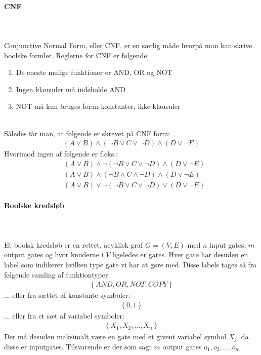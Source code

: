 \paragraph{CNF} ~\\ ~\\ Conjunctive Normal Form, eller CNF, er en særlig
måde hvorpå man kan skrive boolske formler. Reglerne for CNF er følgende:
\begin{enumerate} \item De eneste mulige funktioner er AND, OR og NOT \item
Ingen klausuler må indeholde AND \item NOT må kun bruges foran konstanter,
ikke klausuler \end{enumerate} ~\\ Således får man, at følgende er skrevet
på CNF form: \begin{align*} (A \vee B) \wedge (\neg B \vee C \vee \neg D)
\wedge (D \vee \neg E) \end{align*} Hvorimod ingen af følgende er f.eks.:
\begin{align*} &(A \vee B) \wedge \neg(\neg B \vee C \vee \neg D) \wedge (D \vee
\neg E) \\ &(A \vee B) \wedge (\neg B \wedge C \wedge \neg D) \wedge (D \vee
\neg E) \\ &(A \vee B) \vee \neg(\neg B \vee C \vee \neg D) \vee (D \vee \neg E)
\end{align*}

\paragraph{Boolske kredsløb} ~\\ ~\\ Et boolsk kredsløb er en rettet, acyklisk
graf $G=(V,E)$ med $n$ input gates, $m$ output gates og hvor knuderne i $V$
ligeledes er gates. Hver gate har desuden en label som indikerer hvilken type
gate vi har at gøre med. Disse labels tages så fra følgende samling af
funktiontyper: \begin{align*} \left\lbrace AND, OR, NOT, COPY \right\rbrace
\end{align*} ... eller fra sættet af konstante symboler: \begin{align*}
\left\lbrace 0,1 \right\rbrace \end{align*} ... eller fra et sæt af variabel
symboler: \begin{align*} \left\lbrace X_1, X_2, \hdots, X_n \right\rbrace
\end{align*} Der må desuden maksimalt være en gate med et givent variabel
symbol $X_j$, da disse er inputgates. Tilsvarende er der som sagt $m$ output
gates $o_1,o_2,\hdots,o_m$.

